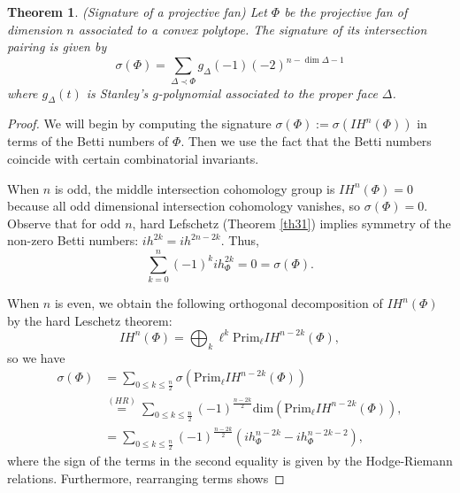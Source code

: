 \documentclass[12pt,leqno,twoside]{amsart}
\newtheorem{thm}{Theorem}[section]
\begin{document}
\begin{thm} (Signature of a projective fan) \label{th33} Let $\Phi$ be the projective fan of dimension $n$ associated to a convex polytope. The signature of its intersection pairing is given by $$\sigma(\Phi)=\sum_{\Delta\prec\Phi} g_\Delta(-1)(-2)^{n-\dim\Delta-1}$$
where $g_\Delta(t)$ is Stanley's $g$-polynomial associated to the proper face $\Delta$.
\end{thm}


\begin{proof} We will begin by computing the signature $\sigma(\Phi):=\sigma(IH^n(\Phi))$ in terms of the Betti numbers of $\Phi$. Then we use the fact that the Betti numbers coincide with certain combinatorial invariants.

When $n$ is odd, the middle intersection cohomology group is $IH^n(\Phi)=0$ because all odd dimensional intersection cohomology vanishes, so $\sigma(\Phi)=0$. Observe that for odd $n$, hard Lefschetz (Theorem \ref{th31}) implies symmetry of the non-zero Betti numbers: $ih^{2k}=ih^{2n-2k}$. Thus, 
\begin{equation}\sum_{k=0}^n (-1)^kih_{\Phi}^{2k}=0=\sigma(\Phi).
\end{equation}

When $n$ is even, we obtain the following orthogonal decomposition of $IH^n(\Phi)$ by the hard Leschetz theorem:
\begin{equation}
   IH^n(\Phi)=\bigoplus_k \ell^{k}\text{Prim}_\ell IH^{n-2k}(\Phi), 
\end{equation}
so we have
\begin{equation}
\begin{split}
    \sigma(\Phi)&=\sum_{0\leq k\leq \frac{n}{2}}\sigma(\text{Prim}_\ell IH^{n-2k}(\Phi)) \\
   & \overset{(HR)}{=}\sum_{0\leq k\leq \frac{n}{2}}(-1)^\frac{n-2k}{2}\text{dim}(\text{Prim}_\ell IH^{n-2k}(\Phi)),\\
&=\sum_{0\leq k\leq \frac{n}{2}}(-1)^\frac{n-2k}{2}(ih_\Phi^{n-2k}-ih_\Phi^{n-2k-2}),
\end{split}
\end{equation}
where the sign of the terms in the second equality is given by the Hodge-Riemann relations. Furthermore, rearranging terms shows 


\end{proof}
\end{document}
